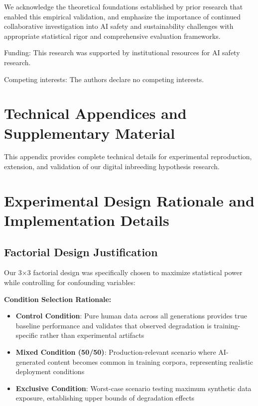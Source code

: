 \documentclass{article}
\begin{document}
\begin{ack}
We acknowledge the theoretical foundations established by prior research that enabled this empirical validation, and emphasize the importance of continued collaborative investigation into AI safety and sustainability challenges with appropriate statistical rigor and comprehensive evaluation frameworks.

Funding: This research was supported by institutional resources for AI safety research.

Competing interests: The authors declare no competing interests.
\end{ack}




\appendix

\section*{Technical Appendices and Supplementary Material}

This appendix provides complete technical details for experimental reproduction, extension, and validation of our digital inbreeding hypothesis research.

\section{Experimental Design Rationale and Implementation Details}
\label{appendix:experimental_design}

\subsection{Factorial Design Justification}

Our 3×3 factorial design was specifically chosen to maximize statistical power while controlling for confounding variables:

\textbf{Condition Selection Rationale:}
\begin{itemize}
    \item \textbf{Control Condition}: Pure human data across all generations provides true baseline performance and validates that observed degradation is training-specific rather than experimental artifacts
    \item \textbf{Mixed Condition (50/50)}: Production-relevant scenario where AI-generated content becomes common in training corpora, representing realistic deployment conditions
    \item \textbf{Exclusive Condition}: Worst-case scenario testing maximum synthetic data exposure, establishing upper bounds of degradation effects
\end{itemize}
\end{document}
